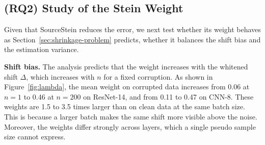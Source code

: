 \begin{table}[t]
\centering
\renewcommand{\arraystretch}{0.9}
\caption{Error (\%) on CIFAR-10-C at severity 3, averaged over 15 corruptions. The best result in each column is \textbf{bold}.}
\label{tab:sev3}
\vspace{-10pt}
\end{table}

\subsection{(RQ2) Study of the Stein Weight} \label{sec:mechanism}
Given that SourceStein reduces the error, we next test whether its weight behaves as Section~\ref{sec:shrinkage-problem} predicts, \ie whether it balances the shift bias and the estimation variance.

\textbf{Shift bias.} The analysis predicts that the weight increases with the whitened shift $\Delta$, which increases with $n$ for a fixed corruption.
As shown in Figure~\ref{fig:lambda}, the mean weight on corrupted data increases from 0.06 at $n{=}1$ to 0.46 at $n{=}200$ on ResNet-14, and from 0.11 to 0.47 on CNN-8.
These weights are 1.5 to 3.5 times larger than on clean data at the same batch size.
This is because a larger batch makes the same shift more visible above the noise.
Moreover, the weights differ strongly across layers, which a single pseudo sample size cannot express.

